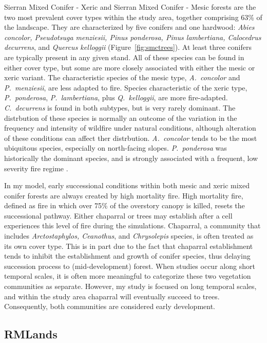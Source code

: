 Sierran Mixed Conifer - Xeric and Sierran Mixed Conifer - Mesic forests are the two most prevalent cover types within the study area, together comprising 63\% of the landscape. They are characterized by five conifers and one hardwood: \emph{Abies concolor, Pseudotsuga menziesii, Pinus ponderosa, Pinus lambertiana, Calocedrus decurrens}, and \emph{Quercus kelloggii} (Figure~\ref{fig:smctrees}). At least three conifers are typically present in any given stand. All of these species can be found in either cover type, but some are more closely associated with either the mesic or xeric variant. The characteristic species of the mesic type, \emph{A.~concolor} and \emph{P.~menziesii}, are less adapted to fire. Species characteristic of the xeric type, \emph{P.~ponderosa}, \emph{P.~lambertiana}, plus \emph{Q.~kelloggii}, are more fire-adapted. \emph{C.~decurrens} is found in both subtypes, but is very rarely dominant. The distrbution of these species is normally an outcome of the variation in the frequency and intensity of wildfire under natural conditions, although alteration of these conditions can affect ther distrbution. \emph{A.~concolor} tends to be the most ubiquitous species, especially on north-facing slopes. \emph{P.~ponderosa} was historically the dominant species, and is strongly associated with a frequent, low severity fire regime \cite{WHR1988,Landfire2007}.


In my model, early successional conditions within both mesic and xeric mixed conifer forests are always created by high mortality fire. High mortality fire, defined as fire in which over 75\% of the overstory canopy is killed, resets the successional pathway. Either chaparral or trees may establish after a cell experiences this level of fire during the simulations. Chaparral, a community that includes \emph{Arctostaphylos, Ceanothus}, and \emph{Chrysolepis} species, is often treated as its own cover type. This is in part due to the fact that chaparral establishment tends to inhibit the establishment and growth of conifer species, thus delaying succession process to (mid-development) forest. When studies occur along short temporal scales, it is often more meaningful to categorize these two vegetation communities as separate. However, my study is focused on long temporal scales, and within the study area chaparral will eventually succeed to trees. Consequently, both communities are considered early development. 

\subsection{RMLands}

